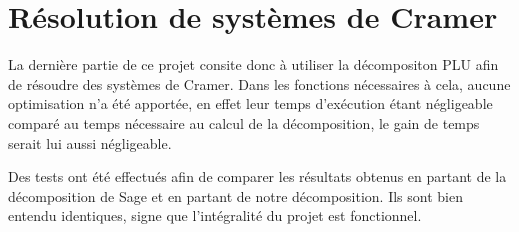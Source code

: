 \documentclass[11pt]{article}
\begin{document}
\section{Résolution de systèmes de Cramer}

La dernière partie de ce projet consite donc à utiliser la décompositon PLU afin de résoudre des systèmes de Cramer. Dans les fonctions nécessaires à cela, aucune optimisation n'a été apportée, en effet leur temps d'exécution étant négligeable comparé au temps nécessaire au calcul de la décomposition, le gain de temps serait lui aussi négligeable.

Des tests ont été effectués afin de comparer les résultats obtenus en partant de la décomposition de Sage et en partant de notre décomposition. Ils sont bien entendu identiques, signe que l'intégralité du projet est fonctionnel.
\end{document}
